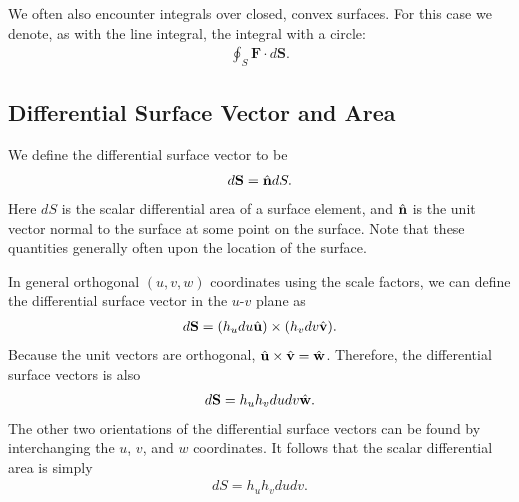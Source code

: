 We often also encounter integrals over closed, convex surfaces. For this case we denote, as with the line integral, the integral with a circle:
\begin{align}
  \oint_S \mathbf{F} \cdot d\mathbf{S} .
\end{align}

\subsection{Differential Surface Vector and Area}

We define the differential surface vector to be
\begin{align}
  d\mathbf{S} = \hat{\mathbf{n}} dS.
\end{align}
Here $dS$ is the scalar differential area of a surface element, and $\hat{\mathbf{n}}$ is the unit vector normal to the surface at some point on the surface. Note that these quantities generally often upon the location of the surface.

In general orthogonal $(u,v,w)$ coordinates using the scale factors, we can define the differential surface vector in the $u$-$v$ plane as
\begin{align}
  d\mathbf{S} = ( h_u du \hat{\mathbf{u}} ) \times ( h_v dv \hat{\mathbf{v}} ).
\end{align}
Because the unit vectors are orthogonal, $\hat{\mathbf{u}} \times \hat{\mathbf{v}} = \hat{\mathbf{w}}$. Therefore, the differential surface vectors is also
\begin{align}
  d\mathbf{S} = h_u h_v du dv \hat{\mathbf{w}}.
\end{align}
The other two orientations of the differential surface vectors can be found by interchanging the $u$, $v$, and $w$ coordinates. It follows that the scalar differential area is simply
\begin{align}
  dS = h_u h_v du dv.
\end{align}

